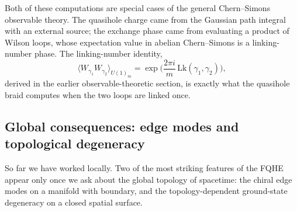 Both of these computations are special cases of the general Chern--Simons observable theory. The quasihole charge came from the Gaussian path integral with an external source; the exchange phase came from evaluating a product of Wilson loops, whose expectation value in abelian Chern--Simons is a linking-number phase. The linking-number identity,
\begin{equation}
  \bigl\langle W_{\gamma_1}W_{\gamma_2}\bigr\rangle_{U(1)_m}
  =
  \exp\!\Big(\frac{2\pi i}{m}\,\mathrm{Lk}(\gamma_1,\gamma_2)\Big),
\end{equation}
derived in the earlier observable-theoretic section, is exactly what the quasihole braid computes when the two loops are linked once.

\subsection{Global consequences: edge modes and topological degeneracy}
\label{subsec:fqhe-global}

So far we have worked locally. Two of the most striking features of the FQHE appear only once we ask about the global topology of spacetime: the chiral edge modes on a manifold with boundary, and the topology-dependent ground-state degeneracy on a closed spatial surface.

